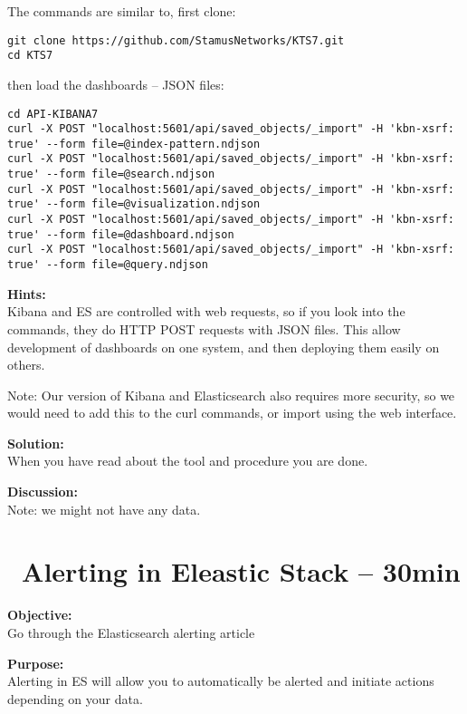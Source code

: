 \documentclass[a4paper,11pt,notitlepage]{report}
\begin{document}
The commands are similar to, first clone:
\begin{verbatim}
git clone https://github.com/StamusNetworks/KTS7.git
cd KTS7
\end{verbatim}

\eject
then load the dashboards -- JSON files:
\begin{verbatim}
cd API-KIBANA7
curl -X POST "localhost:5601/api/saved_objects/_import" -H 'kbn-xsrf: true' --form file=@index-pattern.ndjson
curl -X POST "localhost:5601/api/saved_objects/_import" -H 'kbn-xsrf: true' --form file=@search.ndjson
curl -X POST "localhost:5601/api/saved_objects/_import" -H 'kbn-xsrf: true' --form file=@visualization.ndjson
curl -X POST "localhost:5601/api/saved_objects/_import" -H 'kbn-xsrf: true' --form file=@dashboard.ndjson
curl -X POST "localhost:5601/api/saved_objects/_import" -H 'kbn-xsrf: true' --form file=@query.ndjson
\end{verbatim}



{\bf Hints:}\\
Kibana and ES are controlled with web requests, so if you look into the commands, they do HTTP POST requests with JSON files. This allow development of dashboards on one system, and then deploying them easily on others.

Note: Our version of Kibana and Elasticsearch also requires more security, so we would need to add this to the curl commands, or import using the web interface.

{\bf Solution:}\\
When you have read about the tool and procedure you are done.

{\bf Discussion:}\\
Note: we might not have any data.



\chapter{\faInfoCircle\ Alerting in Eleastic Stack -- 30min}
\label{ex:es7-alerting}


{\bf Objective:}\\
Go through the Elasticsearch alerting article

{\bf Purpose:}\\
Alerting in ES will allow you to automatically be alerted and initiate actions depending on your data.
\end{document}
